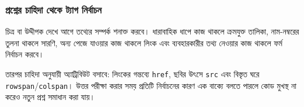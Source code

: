 \subsubsection{প্রশ্নের চাহিদা থেকে ট্যাগ নির্বাচন}
চিত্র বা উদ্দীপক দেখে আগে তথ্যের সম্পর্ক শনাক্ত করবে। ধারাবাহিক ধাপে কাজ থাকলে ক্রমযুক্ত তালিকা, নাম-নম্বরের তুলনা থাকলে সারণি, অন্য পেজে যাওয়ার কাজ থাকলে লিংক এবং ব্যবহারকারীর তথ্য নেওয়ার কাজ থাকলে ফর্ম নির্বাচন করবে।

তারপর চাহিদা অনুযায়ী অ্যাট্রিবিউট বসাবে: লিংকের গন্তব্যে \texttt{href}, ছবির উৎসে \texttt{src} এবং বিস্তৃত ঘরে \texttt{rowspan}/\texttt{colspan}। উত্তর পরীক্ষা করার সময় প্রতিটি নির্বাচনের কারণ এক বাক্যে বলতে পারলে কোড মুখস্থ না করেও নতুন প্রশ্ন সমাধান করা যায়।
